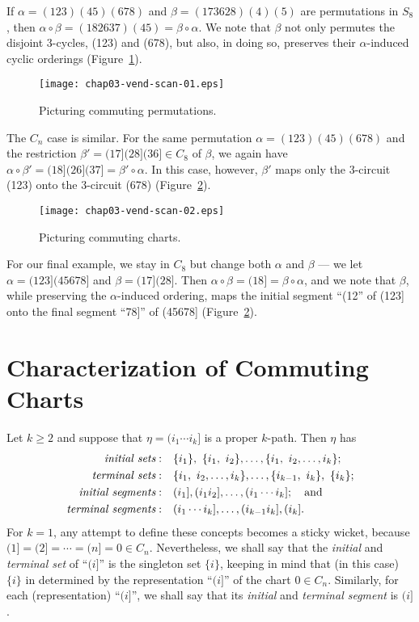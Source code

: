 \documentclass{surv-l}
\numberwithin{equation}{section}
\numberwithin{table}{section}
\numberwithin{figure}{section}
\theoremstyle{definition}
\begin{document}
If $\alpha=(123)(45)(678)$ and $\beta=(173628)(4)(5)$ are
permutations in $S_{8}$, then $\alpha \circ\beta=(182637)(45) =\beta
\circ\alpha$. We note that $\beta$ not only permutes the disjoint
3-cycles, (123) and (678), but also, in doing so, preserves their
$\alpha$-induced cyclic orderings (Figure~\ref{fig3.9.1}).

\begin{figure}[!h]
\texttt{[image: chap03-vend-scan-01.eps]}
\caption{Picturing commuting permutations.\label{fig3.9.1}}
\end{figure}

The $C_{n}$ case is similar. For the same permutation
$\alpha=(123)(45)(678)$ and the restriction
$\beta'=(17](28](36]\in C_{8}$ of $\beta$, we again have
$\alpha\circ\beta'=(18](26](37]=\beta'\circ \alpha$. In this case,
however, $\beta'$ maps only the 3-circuit (123) onto the 3-circuit
(678) (Figure~\ref{fig3.9.2}).

\begin{figure}[!h]
\texttt{[image: chap03-vend-scan-02.eps]}
\caption{Picturing commuting charts.\label{fig3.9.2}}
\end{figure}

For our final example, we stay in $C_{8}$ but change both $\alpha$
and $\beta$ --- we let $\alpha=(123](45678]$ and $\beta=(17](28]$.
Then $\alpha \circ\beta=(18]=\beta \circ\alpha$, and we note that
$\beta$, while preserving the $\alpha$-induced ordering, maps the
initial segment ``(12'' of (123] onto the final segment ``78]'' of
(45678] (Figure~\ref{fig3.9.2}).

\section{Characterization of Commuting Charts}\label{sec3.10}

Let $k\geq 2$ and suppose that $\eta=(i_{1}\cdots i_{k}]$ is a
proper $k$-path. Then $\eta$ has
\begin{align*}
\emph{initial sets}:\index{initial sets of}\quad &\{i_{1}\},\ \{i_{1},\ i_{2}\},\ldots,
\{i_{1},\ i_{2},\ldots, i_{k}\}; \\
\emph{terminal sets}:\quad &\{i_{1},\ i_{2},\ldots, i_{k}\},\ldots, \{i_{k-1},\ i_{k}\},\ \{i_{k}\}; \\
\emph{initial segments}:\quad &(i_{1}], (i_{1}i_{2}],\ldots,(i_{1}\cdots i_{k}];\quad \mathrm{and} \\
\emph{terminal segments}:\quad &(i_{1}\cdots i_{k}],\ldots,(i_{k-1}i_{k}],(i_{k}].
\end{align*}
For $k=1$, any attempt to define these concepts becomes a sticky
wicket, because $(1]=(2]=\cdots=(n]=0\in C_{n}$. Nevertheless, we
shall say that the \emph{initial} and
\emph{terminal set} of ``$(i]$'' is the
singleton set $\{i\}$, keeping in mind that (in this case) $\{i\}$
in determined by the representation ``$(i]$'' of the chart $0\in
C_{n}$. Similarly, for each (representation) ``$(i]$'', we shall
say that its \emph{initial} and \emph{terminal
segment} is $(i]$.
\end{document}
